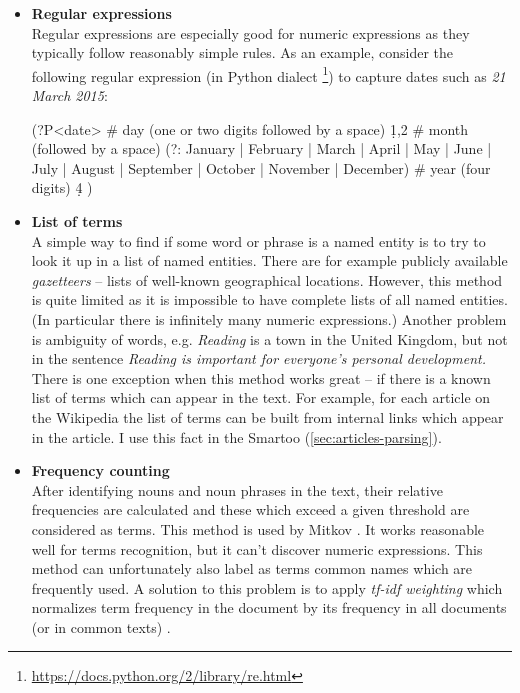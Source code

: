 \documentclass[12pt, twoside]{fithesis2}
\renewcommand{\_}{\leavevmode \kern0.07em\vbox{\hrule width0.4em}}
\newcommand{\squarebullet}{\textcolor{black}{\raisebox{0.15em}{\rule{4pt}{4pt}}}}
\newcommand{\emptysquarebullet}{\textcolor{black}{\raisebox{0.10em}{\tiny$\square$}}}
\newenvironment{myItemize}{
  \begin{itemize}[leftmargin=2em,rightmargin=1em,itemsep=\parskip ,parsep=0em,topsep=0em,partopsep=0em]
  \renewcommand{\labelitemi}{\squarebullet}
  \renewcommand{\labelitemii}{\textbullet}
}{
  \end{itemize}
}
\begin{document}
\begin{myItemize}
\item \textbf{Regular expressions}\\
  Regular expressions are especially good for numeric expressions as they typically follow reasonably simple rules.
  As an example, consider the following regular expression (in Python dialect%
  \footnote{\url{https://docs.python.org/2/library/re.html}})
  to capture dates such as \emph{21 March 2015}:
\begin{code}
(?P<date>
    # day (one or two digits followed by a space)
    \d{1,2} \s
    # month (followed by a space)
    (?: January | February | March | April | May | June | July |
         August | September | October | November | December) \s
    # year (four digits)
    \d{4}
)
\end{code}


\item \textbf{List of terms}\\
  A simple way to find if some word or phrase is a named entity is to try to look it up in a list of named entities. There are for example publicly available \textit{gazetteers} -- lists of well-known geographical locations. However, this method is quite limited as it is impossible to have complete lists of all named entities.
(In particular there is infinitely many numeric expressions.)
Another problem is ambiguity of words, e.g. \textit{Reading} is a town in the United Kingdom, but not in the sentence \textit{Reading is important for everyone's personal development.}
  There is one exception when this method works great -- if there is a known list of terms which can appear in the text. For example, for each article on the Wikipedia the list of terms can be built from internal links which appear in the article. I use this fact in the Smartoo (\autoref{sec:articles-parsing}).

\item \textbf{Frequency counting}\\
  After identifying nouns and noun phrases in the text, their relative frequencies are calculated and these which exceed a given threshold are considered as terms.
  This method is used by Mitkov \cite{question-gen-mitkov}. It works reasonable well for terms recognition, but it can't discover numeric expressions.
This method can unfortunately also label as terms common names which are frequently used.
A solution to this problem is to apply \textit{tf-idf weighting} which normalizes term frequency in the document by its frequency in all documents (or in common texts) \cite[][118]{information-retrieval}.


\end{myItemize}
\end{document}
